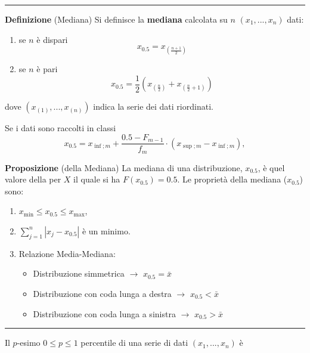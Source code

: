 \documentclass[
  11pt,
]{book}
\providecommand{\tightlist}{%
  \setlength{\itemsep}{0pt}\setlength{\parskip}{0pt}}
\theoremstyle{mytheoremstyle}
\theoremstyle{mydefstyle}
\begin{document}
\begin{center}\rule{0.5\linewidth}{0.5pt}\end{center}

\textbf{Definizione} (Mediana) Si definisce la \textbf{mediana} calcolata su \(n\) \((x_1,...,x_n)\) dati:

\begin{enumerate}
\def\labelenumi{\arabic{enumi}.}
\tightlist
\item
  se \(n\) è dispari
  \[x_{0.5}=x_{\left(\frac{n+1}{2}\right)}\]
\item
  se \(n\) è pari
  \[x_{0.5}=\frac 1 2 \left(x_{\left(\frac{n}{2}\right)}+x_{\left(\frac{n}{2}+1\right)}\right)\]
\end{enumerate}

dove \((x_{(1)},...,x_{(n)})\) indica la serie dei dati riordinati.

Se i dati sono raccolti in classi
\[x_{0.5}=x_{\inf;m}+\frac{0.5-F_{m-1}}{f_m}\cdot \left(x_{\sup;m}-x_{\inf;m} \right),\]

\textbf{Proposizione} (della Mediana)
La mediana di una distribuzione, \(x_{0.5}\), è quel valore della per
\(X\) il quale si ha \(F(x_{0.5}) = 0.5\). Le proprietà della mediana
(\(x_{0.5}\)) sono:

\begin{enumerate}
\def\labelenumi{\arabic{enumi}.}
\tightlist
\item
  \(x_{\min} \leq x_{0.5} \leq x_{\max}\),
\item
  \(\sum_{j=1}^{n} |x_{j} - x_{0.5}|\) è un minimo.
\item
  Relazione Media-Mediana:

  \begin{itemize}
  \tightlist
  \item
    Distribuzione simmetrica \(\rightarrow\) \(x_{0.5} = \bar{x}\)
  \item
    Distribuzione con coda lunga a destra \(\rightarrow\) \(x_{0.5} < \bar{x}\)
  \item
    Distribuzione con coda lunga a sinistra \(\rightarrow\) \(x_{0.5} > \bar{x}\)
  \end{itemize}
\end{enumerate}

\begin{center}\rule{0.5\linewidth}{0.5pt}\end{center}

Il \(p\)-esimo \(0\le p \le 1\) percentile di una serie di dati \((x_1,...,x_n)\) è
\end{document}
